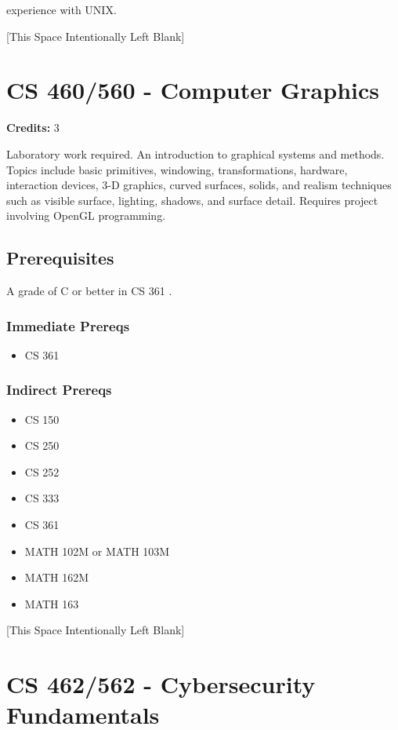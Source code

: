 \documentclass[]{article}
\providecommand{\tightlist}{%
  \setlength{\itemsep}{0pt}\setlength{\parskip}{0pt}}
\newcommand{\pagebreakhere}{
\vspace*{\fill}
\begin{center}
[This Space Intentionally Left Blank]
\end{center}
\vspace*{\fill}
\newpage
}
\begin{document}
experience with UNIX.

\pagebreakhere
\section{CS 460/560 - Computer
Graphics}\label{cs-460560---computer-graphics}

\textbf{Credits:} 3

Laboratory work required. An introduction to graphical systems and
methods. Topics include basic primitives, windowing, transformations,
hardware, interaction devices, 3-D graphics, curved surfaces, solids,
and realism techniques such as visible surface, lighting, shadows, and
surface detail. Requires project involving OpenGL programming.

\subsection{Prerequisites}\label{prerequisites-38}

A grade of C or better in CS 361 .

\subsubsection{Immediate Prereqs}\label{immediate-prereqs-29}

\begin{itemize}
\tightlist
\item
  CS 361
\end{itemize}

\subsubsection{Indirect Prereqs}\label{indirect-prereqs-29}

\begin{itemize}
\tightlist
\item
  CS 150
\item
  CS 250
\item
  CS 252
\item
  CS 333
\item
  CS 361
\item
  MATH 102M or MATH 103M
\item
  MATH 162M
\item
  MATH 163
\end{itemize}

\pagebreakhere
\section{CS 462/562 - Cybersecurity
Fundamentals}\label{cs-462562---cybersecurity-fundamentals}
\end{document}
